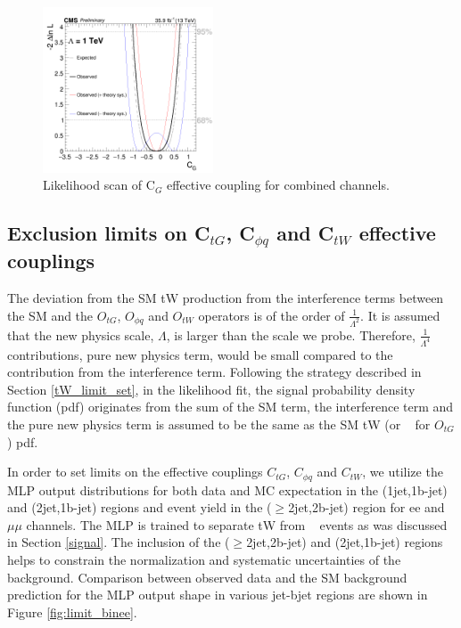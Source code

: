 \begin{figure}[ht]
  \begin{center}
      \includegraphics[width=0.45\textwidth]{figures/tW/fig/scan_all_plot/Cg_combined_scan.png}
    \caption{Likelihood scan of C$_{G}$ effective coupling for combined channels.
    \label{fig:EFT_scan_CG}}
  \end{center}
\end{figure}

\clearpage
\subsection {Exclusion limits on \texorpdfstring{C$_{tG}$, C$_{\phi q}$ and C$_{tW}$ effective couplings}{}}
The deviation from the SM tW production from the interference terms between the
SM and the $O_{tG}$, $O_{\phi q}$ and $O_{tW}$ operators is of the order of $\frac{1}{\Lambda^2}$.
It is assumed that the new physics scale, $\Lambda$, is larger  than the scale we  probe. Therefore, $\frac{1}{\Lambda^4}$
contributions, pure new physics term, would be small compared to the contribution from the interference term.
Following the strategy described in Section \ref{tW_limit_set}, in the likelihood fit, the signal probability density function (pdf) originates from the sum of the SM term, the interference term and the pure new physics term is assumed to be the same as the SM tW (or \ttbar~ for $O_{tG}$) pdf.


In order to set limits on the effective couplings $C_{tG}$, $C_{\phi q}$ and $C_{tW}$, we utilize the MLP output distributions for both data and MC expectation in the (1jet,1b-jet)
and (2jet,1b-jet) regions and event yield in the ($\geq$2jet,2b-jet) region for ee and $\mu\mu$ channels.
The MLP is trained to separate tW from \ttbar~ events as was discussed in Section \ref{signal}.
The inclusion of the ($\geq$2jet,2b-jet) and (2jet,1b-jet) regions helps to constrain the normalization and systematic uncertainties of the \ttbar~ background.
Comparison between observed data and the SM background prediction for the MLP output shape in various jet-bjet regions are shown in Figure \ref{fig:limit_binee}.


